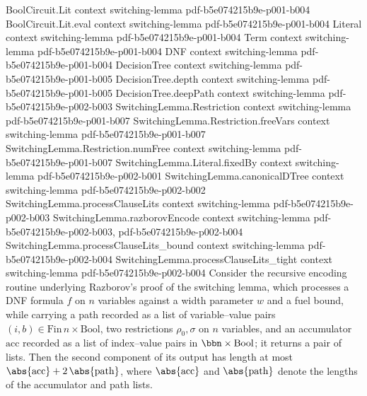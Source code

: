 \begin{lemma}
\label{SwitchingLemma.encode_go_aux_length_bound}
\leanok
{}
\proofstep
  {BoolCircuit.Lit}
  {context}
  {switching-lemma}
  {pdf-b5e074215b9e-p001-b004}
\proofstep
  {BoolCircuit.Lit.eval}
  {context}
  {switching-lemma}
  {pdf-b5e074215b9e-p001-b004}
\proofstep
  {Literal}
  {context}
  {switching-lemma}
  {pdf-b5e074215b9e-p001-b004}
\proofstep
  {Term}
  {context}
  {switching-lemma}
  {pdf-b5e074215b9e-p001-b004}
\proofstep
  {DNF}
  {context}
  {switching-lemma}
  {pdf-b5e074215b9e-p001-b004}
\proofstep
  {DecisionTree}
  {context}
  {switching-lemma}
  {pdf-b5e074215b9e-p001-b005}
\proofstep
  {DecisionTree.depth}
  {context}
  {switching-lemma}
  {pdf-b5e074215b9e-p001-b005}
\proofstep
  {DecisionTree.deepPath}
  {context}
  {switching-lemma}
  {pdf-b5e074215b9e-p002-b003}
\proofstep
  {SwitchingLemma.Restriction}
  {context}
  {switching-lemma}
  {pdf-b5e074215b9e-p001-b007}
\proofstep
  {SwitchingLemma.Restriction.freeVars}
  {context}
  {switching-lemma}
  {pdf-b5e074215b9e-p001-b007}
\proofstep
  {SwitchingLemma.Restriction.numFree}
  {context}
  {switching-lemma}
  {pdf-b5e074215b9e-p001-b007}
\proofstep
  {SwitchingLemma.Literal.fixedBy}
  {context}
  {switching-lemma}
  {pdf-b5e074215b9e-p002-b001}
\proofstep
  {SwitchingLemma.canonicalDTree}
  {context}
  {switching-lemma}
  {pdf-b5e074215b9e-p002-b002}
\proofstep
  {SwitchingLemma.processClauseLits}
  {context}
  {switching-lemma}
  {pdf-b5e074215b9e-p002-b003}
\proofstep
  {SwitchingLemma.razborovEncode}
  {context}
  {switching-lemma}
  {pdf-b5e074215b9e-p002-b003,
    pdf-b5e074215b9e-p002-b004}
\proofstep
  {SwitchingLemma.processClauseLits_bound}
  {context}
  {switching-lemma}
  {pdf-b5e074215b9e-p002-b004}
\proofstep
  {SwitchingLemma.processClauseLits_tight}
  {context}
  {switching-lemma}
  {pdf-b5e074215b9e-p002-b004}
Consider the recursive encoding routine underlying Razborov's proof of the switching
lemma, which processes a DNF formula $f$ on $n$ variables against a width parameter $w$
and a fuel bound, while carrying a path recorded as a list of variable–value pairs
$(i,b) \in \mathrm{Fin}\,n \times \mathrm{Bool}$, two restrictions $\rho_0, \sigma$ on
$n$ variables, and an accumulator $\mathrm{acc}$ recorded as a list of index–value pairs
in $\bbn \times \mathrm{Bool}$; it returns a pair of lists. Then the second component of
its output has length at most $\abs{\mathrm{acc}} + 2\,\abs{\mathrm{path}}$, where
$\abs{\mathrm{acc}}$ and $\abs{\mathrm{path}}$ denote the lengths of the accumulator and
path lists.
\end{lemma}

